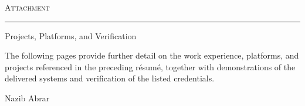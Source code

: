 \documentclass[letterpaper,11pt]{article}
\begin{document}


\newpage
\thispagestyle{empty}
\vspace*{\fill}
\begin{center}
    {\Huge \scshape Attachment}

    \vspace{10pt}
    \rule{0.45\textwidth}{0.4pt}
    \vspace{14pt}

    {\Large Projects, Platforms, and Verification}

    \vspace{18pt}
    \begin{minipage}{0.78\textwidth}
        \centering
        \large
        The following pages provide further detail on the work experience,
        platforms, and projects referenced in the preceding r\'esum\'e,
        together with demonstrations of the delivered systems and
        verification of the listed credentials.
    \end{minipage}

    \vspace{24pt}
    {\large Nazib Abrar}
\end{center}
\vspace*{\fill}


\end{document}

